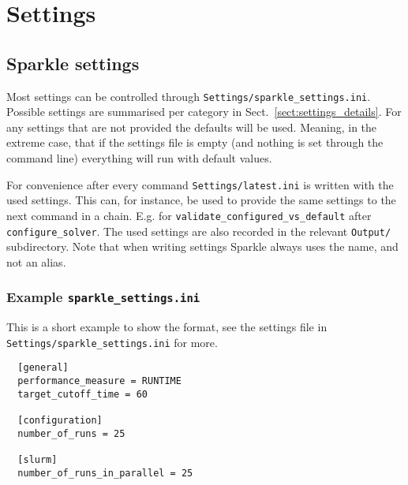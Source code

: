 \documentclass{article}
\begin{document}
\section{Settings}

\subsection{Sparkle settings}
Most settings can be controlled through \texttt{Settings/sparkle\_settings.ini}. Possible settings are summarised per category in Sect.~\ref{sect:settings_details}. For any settings that are not provided the defaults will be used. Meaning, in the extreme case, that if the settings file is empty (and nothing is set through the command line) everything will run with default values.

For convenience after every command \texttt{Settings/latest.ini} is written with the used settings. This can, for instance, be used to provide the same settings to the next command in a chain. E.g. for \texttt{validate\_configured\_vs\_default} after \texttt{configure\_solver}. The used settings are also recorded in the relevant \texttt{Output/} subdirectory. Note that when writing settings Sparkle always uses the name, and not an alias.

\subsubsection{Example \texttt{sparkle\_settings.ini}}
This is a short example to show the format, see the settings file in \texttt{Settings/sparkle\_settings.ini} for more.

\begin{verbatim}
  [general]
  performance_measure = RUNTIME
  target_cutoff_time = 60

  [configuration]
  number_of_runs = 25

  [slurm]
  number_of_runs_in_parallel = 25
\end{verbatim}
\end{document}
